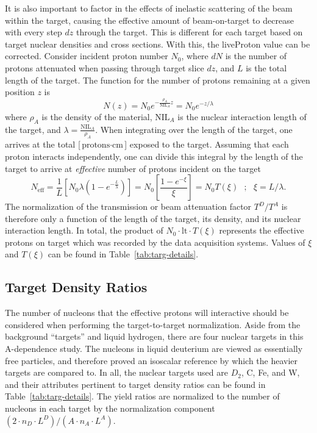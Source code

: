 It is also important to factor in the effects of inelastic scattering of the beam within the target, causing the effective amount of beam-on-target to decrease with every step $dz$ through the target. This is different for each target based on target nuclear densities and cross sections. With this, the liveProton value can be corrected. Consider incident proton number $N_0$, where $dN$ is the number of protons attenuated when passing through target slice $dz$, and $L$ is the total length of the target. The function for the number of protons remaining at a given position $z$ is
\begin{equation}
 N(z) = N_0 e^{-\frac{\rho_A}{\text{NIL}_A} z} = N_0 e^{-z/\lambda}
\end{equation}
where $\rho_A$ is the density of the material, $\text{NIL}_A$ is the nuclear interaction length of the target, and $\lambda = \frac{\text{NIL}_A}{\rho_A}$. When integrating over the length of the target, one arrives at the total [$\text{protons}\cdot \text{cm}$] exposed to the target. Assuming that each proton interacts independently, one can divide this integral by the length of the target to arrive at \emph{effective} number of protons incident on the target
\begin{equation}
N_{\text{eff}} = \frac{1}{L} \left[ N_0 \lambda (1 - e^{-\frac{L}{\lambda}})\right] = N_0 \left[\frac{1 - e^{-\xi}}{\xi}\right] =  N_0 T(\xi)\ \ \ ;\ \ \ 
\xi = L/\lambda.
\end{equation}
The normalization of the transmission or beam attenuation factor $T^D/T^A$ is therefore only a function of the length of the target, its density, and its nuclear interaction length. In total, the product of $N_0 \cdot \text{lt} \cdot T(\xi)$ represents the effective protons on target which was recorded by the data acquisition systems. Values of $\xi$ and $T(\xi)$ can be found in Table~\ref{tab:targ-details}.

\subsection{Target Density Ratios}

The number of nucleons that the effective protons will interactive should be considered when performing the target-to-target normalization. Aside from the background ``targets'' and liquid hydrogen, there are four nuclear targets in this A-dependence study. The nucleons in liquid deuterium are viewed as essentially free particles, and therefore proved an isoscalar reference by which the heavier targets are compared to. In all, the nuclear targets used are $D_2$, C, Fe, and W, and their attributes pertinent to target density ratios can be found in Table~\ref{tab:targ-details}. The yield ratios are normalized to the number of nucleons in each target by the normalization component $(2 \cdot n_D \cdot L^D) / (A \cdot n_A \cdot L^A)$. 

